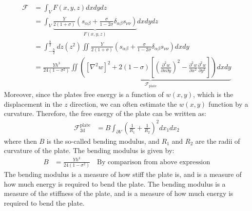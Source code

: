 \documentclass[a4paper]{article}
\newcommand{\f}{\mathcal{F}}
\begin{document}
\begin{align*}
    \f &= \int_V F(x,y,z)dxdydz\\
    &=\int_V \underbrace{\frac{Y}{2(1 + \sigma)}\left(s_{\alpha\beta} + \frac{\sigma}{1 - 2\sigma}\delta_{\alpha\beta}s_{\nu\nu}\right)}_{F(x,y,z)}dxdydz\\
    &=\int_{-\frac{h}{2}}^\frac{h}{2} dz \left(z^2\right) \iint \frac{Y}{2(1 + \sigma)}\left(s_{\alpha\beta} + \frac{\sigma}{1 - 2\sigma}\delta_{\alpha\beta}s_{\nu\nu}\right)dxdy\\
    &=\frac{Yh^3}{24(1 - \sigma^2)}\underbrace{\iint \left(\left[\nabla^2w\right]^2 + 2(1-\sigma)\left[\left(\frac{\partial^2 w}{\partial x\partial y}\right)^2 - \frac{\partial^2 w}{\partial x^2} \frac{\partial^2 w}{\partial y^2}\right]\right)dxdy}_{\f_{\text{plate}}}
\end{align*}
Moreover, since the plates free energy is a function of $w(x,y)$, which is the displacement in the $z$ direction, we can often estimate the $w(x,y)$ function by a curvature. Therefore, the free energy of the plate can be written as:
\begin{align*}
    \f_{\text{2d}}^{\text{plate}} &= B\int_{\partial V} \left(\frac{1}{R_1} + \frac{1}{R_2}\right)^2dx_1dx_2
\end{align*}where then $B$ is the so-called bending modulus, and $R_1$ and $R_2$ are the radii of curvature of the plate. The bending modulus is given by:
\begin{align*}
    B &= \frac{Yh^3}{24(1-\sigma^2)}\quad \text{By comparison from above expression}
\end{align*}The bending modulus is a measure of how stiff the plate is, and is a measure of how much energy is required to bend the plate. The bending modulus is a measure of the stiffness of the plate, and is a measure of how much energy is required to bend the plate.
\end{document}
